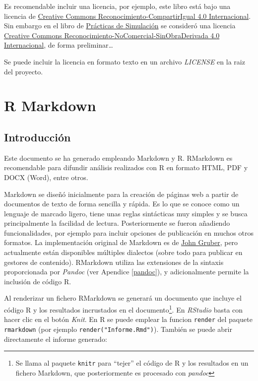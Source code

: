 \documentclass[]{book}
\let\rmarkdownfootnote\footnote%
\def\footnote{\protect\rmarkdownfootnote}
\theoremstyle{definition}
\theoremstyle{definition}
\theoremstyle{definition}
\theoremstyle{remark}
\begin{document}
Es recomendable incluir una licencia, por ejemplo, este libro está bajo
una licencia de
\href{https://creativecommons.org/licenses/by-sa/4.0/deed.es}{Creative
Commons Reconocimiento-CompartirIgual 4.0 Internacional}. Sin embargo en
el libro de \href{https://rubenfcasal.github.io/simbook}{Prácticas de
Simulación} se consideró una licencia
\href{https://creativecommons.org/licenses/by-nc-nd/4.0/deed.es_ES}{Creative
Commons Reconocimiento-NoComercial-SinObraDerivada 4.0 Internacional},
de forma preliminar\ldots{}

Se puede incluir la licencia en formato texto en un archivo
\emph{LICENSE} en la raiz del proyecto.

\appendix


\chapter{R Markdown}\label{rmarkdown}

\section{Introducción}\label{introduccion-1}

Este documento se ha generado empleando Markdown y R. RMarkdown es
recomendable para difundir análisis realizados con R en formato HTML,
PDF y DOCX (Word), entre otros.

Markdown se diseñó inicialmente para la creación de páginas web a partir
de documentos de texto de forma sencilla y rápida. Es lo que se conoce
como un lenguaje de marcado ligero, tiene unas reglas sintácticas muy
simples y se busca principalmente la facilidad de lectura.
Posteriormente se fueron añadiendo funcionalidades, por ejemplo para
incluir opciones de publicación en muchos otros formatos. La
implementación original de Markdown es de
\href{http://daringfireball.net/projects/markdown/}{John Gruber}, pero
actualmente están disponibles múltiples dialectos (sobre todo para
publicar en gestores de contenido). RMarkdown utiliza las extensiones de
la sintaxis proporcionada por \emph{Pandoc} (ver Apendice \ref{pandoc}),
y adicionalmente permite la inclusión de código R.

Al renderizar un fichero RMarkdown se generará un documento que incluye
el código R y los resultados incrustados en el documento\footnote{Se
  llama al paquete \texttt{knitr} para ``tejer'' el código de R y los
  resultados en un fichero Markdown, que posteriormente es procesado con
  \emph{pandoc}}. En \emph{RStudio} basta con hacer clic en el botón
\emph{Knit}. En R se puede emplear la funcion \texttt{render} del
paquete \texttt{rmarkdown} (por ejemplo \texttt{render("Informe.Rmd")}).
También se puede abrir directamente el informe generado:
\end{document}
